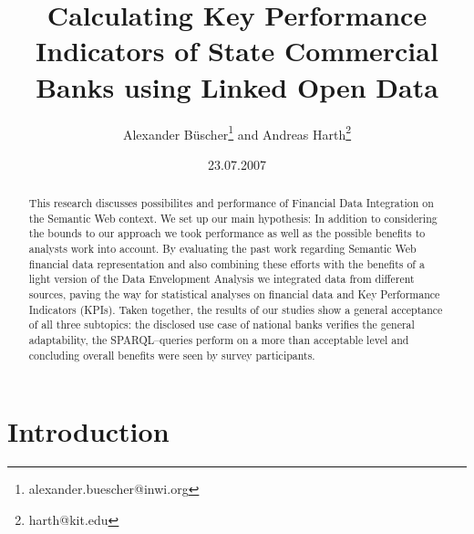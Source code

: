 \documentclass[runningheads]{llncs}
\title{Calculating Key Performance Indicators of State Commercial Banks using Linked Open Data}
\author{Alexander B\"uscher\thanks{alexander.buescher@inwi.org} and Andreas Harth\thanks{harth@kit.edu}}
\institute{Institute of Applied Informatics and Formal Descriptions Methods\\Karlsruhe Institute of Technology, 76131 Karlsruhe, Germany}
\date{23.07.2007}
\begin{document}
\maketitle

\begin{abstract}This research discusses possibilites and performance of Financial Data Integration on the Semantic Web context. We set up our main hypothesis: In addition to considering the bounds to our approach we took performance as well as the possible benefits to analysts work into account. By evaluating the past work regarding Semantic Web financial data representation and also combining these efforts with the benefits of a light version of the Data Envelopment Analysis we integrated data from different sources, paving the way for statistical analyses on financial data and Key Performance Indicators (KPIs). Taken together, the results of our studies show a general acceptance of all three subtopics: the disclosed use case of national banks verifies the general adaptability, the SPARQL--queries perform on a more than acceptable level and concluding overall benefits were seen by survey participants.
\end{abstract}

\section{Introduction}
\end{document}
